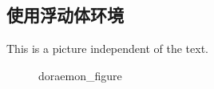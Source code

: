 \documentclass{article}
\begin{document}
\subsection{使用浮动体环境}
    This is a picture independent of the text.
    \begin{figure}[htbp]
        \centering
        \caption{doraemon\_figure}
    \end{figure}
\end{document}
